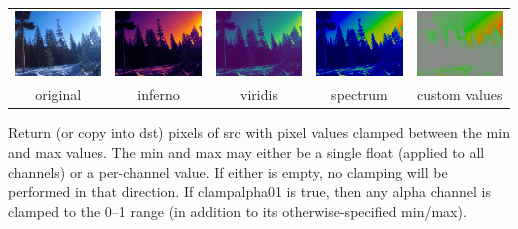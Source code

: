 \noindent \begin{tabular}{ccccc}
\includegraphics[width=0.9in]{figures/tahoe-small.jpg} &
\includegraphics[width=0.9in]{figures/colormap-inferno.jpg} &
\includegraphics[width=0.9in]{figures/colormap-viridis.jpg} &
\includegraphics[width=0.9in]{figures/colormap-spectrum.jpg} &
\includegraphics[width=0.9in]{figures/colormap-custom.jpg} \\
original & inferno & viridis & spectrum & custom values \\
\end{tabular}
\apiend



 

Return (or copy into {\cf dst}) pixels of {\cf src} with pixel values
clamped between the {\cf min} and {\cf max} values. The {\cf min} and
{\cf max} may either be a single float (applied to all channels) or a
per-channel value. If either is empty, no clamping will be performed in
that direction. If {\cf clampalpha01} is {\cf true}, then any alpha
channel is clamped to the 0--1 range (in addition to its otherwise-specified
min/max).

